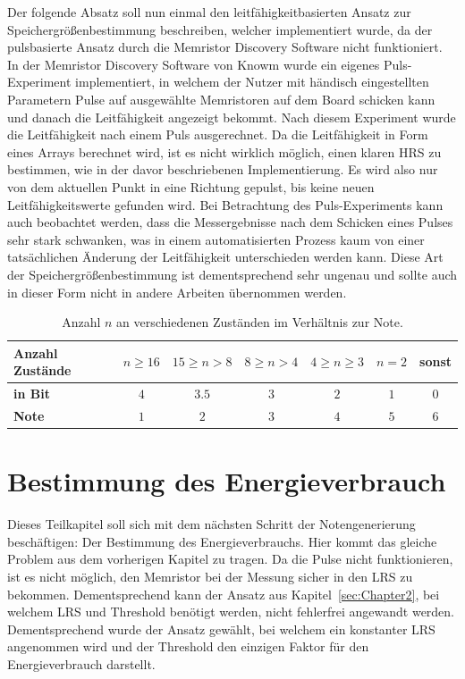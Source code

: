 Der folgende Absatz soll nun einmal den leitfähigkeitbasierten Ansatz zur Speichergrößenbestimmung beschreiben, welcher implementiert wurde, da der pulsbasierte Ansatz durch die Memristor Discovery Software nicht funktioniert. In der Memristor Discovery Software von Knowm wurde ein eigenes Puls-Experiment implementiert, in welchem der Nutzer mit händisch eingestellten Parametern Pulse auf ausgewählte Memristoren auf dem Board schicken kann und danach die Leitfähigkeit angezeigt bekommt. Nach diesem Experiment wurde die Leitfähigkeit nach einem Puls ausgerechnet. Da die Leitfähigkeit in Form eines Arrays berechnet wird, ist es nicht wirklich möglich, einen klaren HRS zu bestimmen, wie in der davor beschriebenen Implementierung. Es wird also nur von dem aktuellen Punkt in eine Richtung gepulst, bis keine neuen Leitfähigkeitswerte gefunden wird. Bei Betrachtung des Puls-Experiments kann auch beobachtet werden, dass die Messergebnisse nach dem Schicken eines Pulses sehr stark schwanken, was in einem automatisierten Prozess kaum von einer tatsächlichen Änderung der Leitfähigkeit unterschieden werden kann. Diese Art der Speichergrößenbestimmung ist dementsprechend sehr ungenau und sollte auch in dieser Form nicht in andere Arbeiten übernommen werden.

\begin{table}
  \centering
  \begin{tabular}{l|c|c|c|c|c|c}
    \textbf{Anzahl Zustände}  & $n \geq 16$ & $ 15 \geq n  > 8$ & $8 \geq n > 4$ & $4 \geq n \geq 3$ & $n=2$ & sonst  \\\hline
    \textbf{in Bit}        & $4$       & $3.5$                & $3$                 & $2$  & $1$  & $0$ \\\hline
    \textbf{Note}          & $1$       & $2$                & $3$                 & $4$  & $5$  & $6$
  \end{tabular}
  \caption{Anzahl $n$ an verschiedenen Zuständen im Verhältnis zur Note.}
  \label{tab:Speichernote}
\end{table}

\section{Bestimmung des Energieverbrauch}

Dieses Teilkapitel soll sich mit dem nächsten Schritt der Notengenerierung beschäftigen: Der Bestimmung des Energieverbrauchs. Hier kommt das gleiche Problem aus dem vorherigen Kapitel zu tragen. Da die Pulse nicht funktionieren, ist es nicht möglich, den Memristor bei der Messung sicher in den LRS zu bekommen. Dementsprechend kann der Ansatz aus Kapitel~\ref{sec:Chapter2}, bei welchem LRS und Threshold benötigt werden, nicht fehlerfrei angewandt werden. Dementsprechend wurde der Ansatz gewählt, bei welchem ein konstanter LRS angenommen wird und der Threshold den einzigen Faktor für den Energieverbrauch darstellt.

